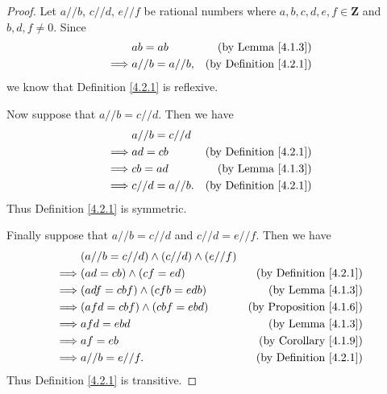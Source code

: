 \begin{proof}
    Let \(a // b\), \(c // d\), \(e // f\) be rational numbers where \(a, b, c, d, e, f \in \mathbf{Z}\) and \(b, d, f \neq 0\).
    Since
    \begin{align*}
                 & ab = ab          & \text{(by Lemma \ref{4.1.3})}      \\
        \implies & a // b = a // b, & \text{(by Definition \ref{4.2.1})}
    \end{align*}
    we know that Definition \ref{4.2.1} is reflexive.

    Now suppose that \(a // b = c // d\).
    Then we have
    \begin{align*}
                 & a // b = c // d                                       \\
        \implies & ad = cb          & \text{(by Definition \ref{4.2.1})} \\
        \implies & cb = ad          & \text{(by Lemma \ref{4.1.3})}      \\
        \implies & c // d = a // b. & \text{(by Definition \ref{4.2.1})}
    \end{align*}
    Thus Definition \ref{4.2.1} is symmetric.

    Finally suppose that \(a // b = c // d\) and \(c // d = e // f\).
    Then we have
    \begin{align*}
                 & (a // b = c // d) \land (c // d) \land (e // f)                                       \\
        \implies & (ad = cb) \land (cf = ed)                       & \text{(by Definition \ref{4.2.1})}  \\
        \implies & (adf = cbf) \land (cfb = edb)                   & \text{(by Lemma \ref{4.1.3})}       \\
        \implies & (afd = cbf) \land (cbf = ebd)                   & \text{(by Proposition \ref{4.1.6})} \\
        \implies & afd = ebd                                       & \text{(by Lemma \ref{4.1.3})}       \\
        \implies & af = eb                                         & \text{(by Corollary \ref{4.1.9})}   \\
        \implies & a // b = e // f.                                & \text{(by Definition \ref{4.2.1})}
    \end{align*}
    Thus Definition \ref{4.2.1} is transitive.
\end{proof}

